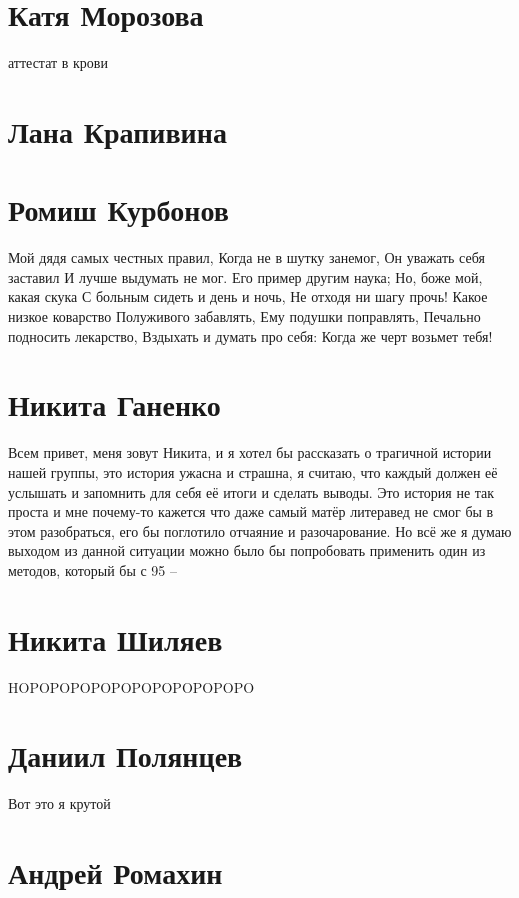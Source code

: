 \documentclass{article}
\begin{document}
\section*{Катя Морозова}
аттестат в крови

\section*{Лана Крапивина}

\section*{Ромиш Курбонов}

Мой дядя самых честных правил, Когда не в шутку занемог, Он уважать себя заставил И лучше выдумать не мог.
Его пример другим наука; Но, боже мой, какая скука С больным сидеть и день и ночь, Не отходя ни шагу прочь!
Какое низкое коварство Полуживого забавлять, Ему подушки поправлять, Печально подносить лекарство,
Вздыхать и думать про себя: Когда же черт возьмет тебя!

\section*{Никита Ганенко}

Всем привет, меня зовут Никита, и я хотел бы рассказать о трагичной истории нашей группы, это история ужасна и страшна, я считаю, что каждый должен её услышать и запомнить для себя её итоги и сделать выводы. Это история не так проста и мне почему-то кажется что даже самый матёр литеравед не смог бы в этом разобраться, его бы поглотило отчаяние и разочарование. Но всё же я думаю выходом из данной ситуации можно было бы попробовать применить один из методов, который бы с 95%
--
\section*{Никита Шиляев}

HOPOPOPOPOPOPOPOPOPOPOPO


\section *{Даниил Полянцев}
Вот это я крутой
\section*{Андрей Ромахин}
\end{document}
